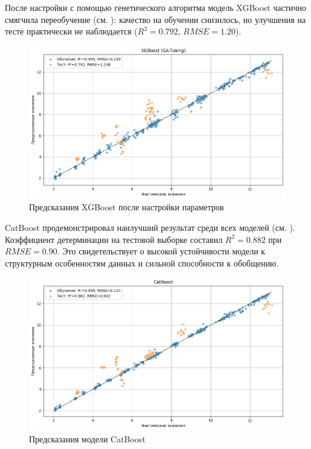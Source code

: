 После настройки с помощью генетического алгоритма модель XGBoost частично смягчила переобучение (см. ): качество на обучении снизилось, но улучшения на тесте практически не наблюдается ($R^2 = 0.792$, $RMSE = 1.20$).


\begin{figure}[htbp!]
	\centering
	\includegraphics[width=.8\linewidth]{my_folder/images/coverage/XGBoost.png}
	\caption{Предсказания XGBoost после настройки параметров} 
	\label{fig:coverage-xgboost}  
\end{figure}
\newpage


CatBoost продемонстрировал наилучший результат среди всех моделей (см. ). Коэффициент детерминации на тестовой выборке составил $R^2 = 0.882$ при $RMSE = 0.90$. Это свидетельствует о высокой устойчивости модели к структурным особенностям данных и сильной способности к обобщению.


\begin{figure}[htbp!]
	\centering
	\includegraphics[width=.9\linewidth]{my_folder/images/coverage/CatBoost.png}
	\caption{Предсказания модели CatBoost} 
	\label{fig:coverage-catboost}  
\end{figure}

